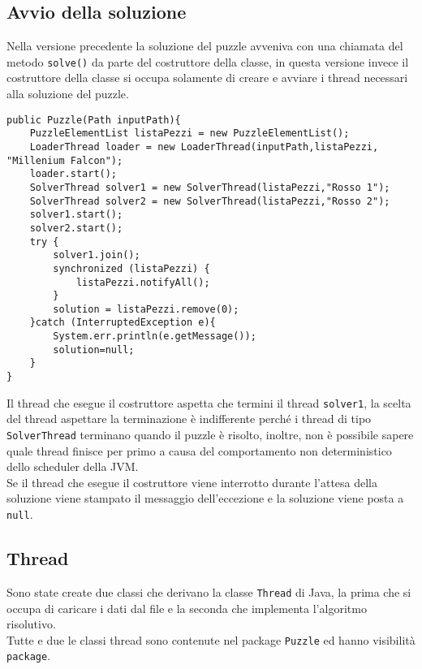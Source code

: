 \documentclass[a4paper, 11pt]{article}
\newcommand{\Null}{\texttt{null}\xspace}
\begin{document}
\subsection{Avvio della soluzione}\label{classpuzzle}
Nella versione precedente la soluzione del puzzle avveniva con una chiamata del metodo \texttt{solve()} da parte del costruttore della classe, in questa versione invece il costruttore della classe si occupa solamente di creare e avviare i thread necessari alla soluzione del puzzle.
\begin{lstlisting}
public Puzzle(Path inputPath){
    PuzzleElementList listaPezzi = new PuzzleElementList();
    LoaderThread loader = new LoaderThread(inputPath,listaPezzi, "Millenium Falcon");
    loader.start();
    SolverThread solver1 = new SolverThread(listaPezzi,"Rosso 1");
    SolverThread solver2 = new SolverThread(listaPezzi,"Rosso 2");
    solver1.start();
    solver2.start();
    try {
        solver1.join();
        synchronized (listaPezzi) {
            listaPezzi.notifyAll();
        }
        solution = listaPezzi.remove(0);
    }catch (InterruptedException e){
        System.err.println(e.getMessage());
        solution=null;
    }
}
\end{lstlisting}
Il thread che esegue il costruttore aspetta che termini il thread \texttt{solver1}, la scelta del thread aspettare la terminazione è indifferente perché i thread di tipo \texttt{SolverThread} terminano quando il puzzle è risolto, inoltre, non è possibile sapere quale thread finisce per primo a causa del comportamento non deterministico dello scheduler della JVM.\\
Se il thread che esegue il costruttore viene interrotto durante l'attesa della soluzione viene stampato il messaggio dell'eccezione e la soluzione viene posta a \Null.

\subsection{Thread}
Sono state create due classi che derivano la classe \texttt{Thread} di Java, la prima che si occupa di caricare i dati dal file e la seconda che implementa l'algoritmo risolutivo.\\
Tutte e due le classi thread sono contenute nel package \texttt{Puzzle} ed hanno visibilità \texttt{package}.
\end{document}

